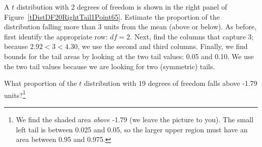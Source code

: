 \begin{example}{A $t$ distribution with 2 degrees of freedom is shown in the right panel of Figure~\ref{tDistDF20RightTail1Point65}. Estimate the proportion of the distribution falling more than 3 units from the mean (above or below).}
As before, first identify the appropriate row: $df=2$. Next, find the columns that capture 3; because $2.92 < 3 < 4.30$, we use the second and third columns. Finally, we find bounds for the tail areas by looking at the two tail values: 0.05 and 0.10. We use the two tail values because we are looking for two (symmetric) tails.
\end{example}

\begin{exercise}
What proportion of the $t$ distribution with 19 degrees of freedom falls above -1.79 units?\footnote{We find the shaded area \emph{above} -1.79 (we leave the picture to you). The small left tail is between 0.025 and 0.05, so the larger upper region must have an area between 0.95 and 0.975.}


\end{exercise}
